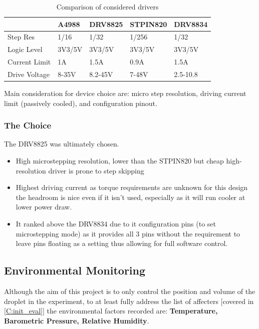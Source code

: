\begin{table}[h]
    \centering
    \begin{tabular}{|l|l|l|l|l|}
        \hline
        \textbf{}     & \textbf{A4988} & \textbf{DRV8825} & \textbf{STPIN820} & \textbf{DRV8834} \\ \hline
        Step Res      & 1/16           & 1/32             & 1/256             & 1/32             \\ \hline
        Logic Level   & 3V3/5V         & 3V3/5V           & 3V3/5V            & 3V3/5V           \\ \hline
        Current Limit & 1A             & 1.5A             & 0.9A              & 1.5A             \\ \hline
        Drive Voltage & 8-35V          & 8.2-45V          & 7-48V             & 2.5-10.8         \\ \hline
    \end{tabular}
    \caption{Comparison of considered drivers}
\end{table}

Main consideration for device choice are: micro step resolution, driving current limit (passively cooled), and configuration pinout.

\subsubsection*{The Choice}
The DRV8825 was ultimately chosen.
\begin{itemize}
    \item High microstepping resolution, lower than the STPIN820 but cheap high-resolution driver is prone to step skipping \cite{step_book}
    \item Highest driving current as torque requirements are unknown for this design the headroom is nice even if it isn't used, especially as it will run cooler at lower power draw.
    \item It ranked above the DRV8834 due to it configuration pins (to set microstepping mode) as it provides all 3 pins without the requirement to leave pins floating as a setting thus allowing for full software control.
\end{itemize}

\newpage
\subsection{Environmental Monitoring}

Although the aim of this project is to only control the position and volume of the droplet in the experiment, to at least fully address the list of affecters [covered in \ref{C:init_eval}] the environmental factors recorded are: \textbf{Temperature, Barometric Pressure, Relative Humidity}.

